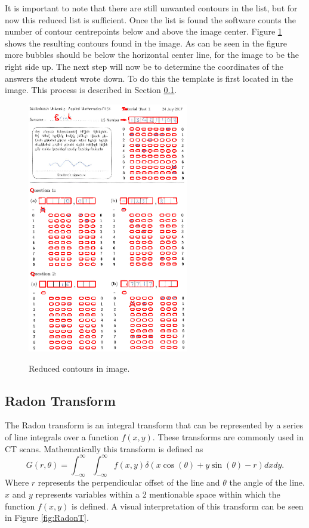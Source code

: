 It is important to note that there are still unwanted contours in the list, but for now this reduced list is sufficient. Once the list is found the software counts the number of contour centrepoints below and above the image center. Figure \ref{fig:reduced} shows the resulting contours found in the image. As can be seen in the figure more bubbles should be below the horizontal center line, for the image to be the right side up. The next step will now be to determine the coordinates of the answers the student wrote down. To do this the template is first located in the image. This process is described in Section \ref{sec:RadonTransform}.

\begin{figure}
  \centering
  \includegraphics[width=7cm]{Reduced}\\
  \caption{Reduced contours in image.}
  \label{fig:reduced}
\end{figure}

\subsection{Radon Transform}
\label{sec:RadonTransform}
The Radon transform is an integral transform that can be represented by a series of line integrals over a function $f(x,y)$. These transforms are commonly used in CT scans. Mathematically this transform is defined as $$G(r,\theta) = \int_{-\infty}^{\infty} \int_{-\infty}^{\infty} f(x, y) \delta(x\cos(\theta) + y\sin(\theta) - r) dx dy.$$Where $r$ represents the perpendicular offset of the line and $\theta$ the angle of the line. $x$ and $y$ represents variables within a 2 mentionable space within which the function $f(x,y)$ is defined.  A visual interpretation of this transform can be seen in Figure \ref{fig:RadonT}.  

